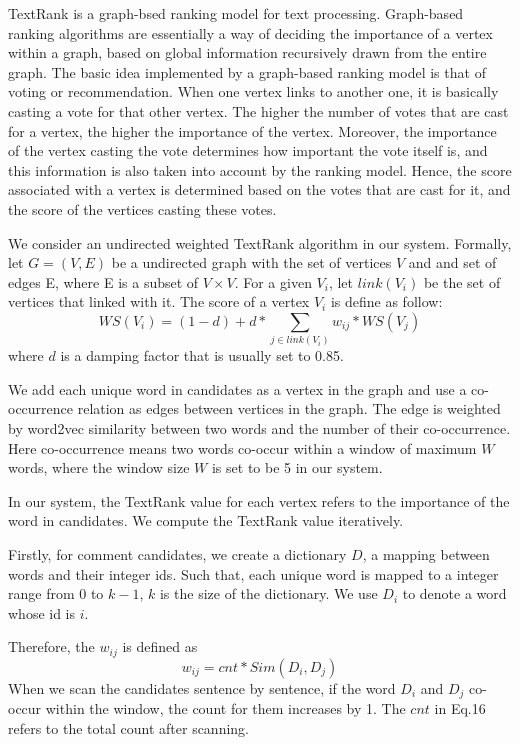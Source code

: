 \documentclass{sig-alternate}
\begin{document}
TextRank\cite{Mihalcea} is a graph-bsed ranking model for text processing. 
Graph-based ranking algorithms are essentially a
way of deciding the importance of a vertex within
a graph, based on global information recursively
drawn from the entire graph. The basic idea implemented
by a graph-based ranking model is that
of voting or recommendation. When one vertex
links to another one, it is basically casting a vote
for that other vertex. The higher the number of votes
that are cast for a vertex, the higher the importance
of the vertex. Moreover, the importance of the vertex
casting the vote determines how important the vote
itself is, and this information is also taken into account
by the ranking model. Hence, the score associated
with a vertex is determined based on the votes
that are cast for it, and the score of the vertices casting
these votes.

We consider an undirected weighted TextRank algorithm in our system. 
Formally, let $G = (V, E)$ be a undirected graph with the set of vertices $V$ and 
and set of edges E, where E is a subset of $V \times V$. For a given $V_i$, let 
$link(V_i)$ be the set of vertices that linked with it. The score of a vertex 
$V_i$ is define as follow:
\begin{equation}
  WS(V_i) = (1 - d) + d * \sum_{j \in link(V_i)}{w_{ij} * WS(V_j)}
\end{equation}
where $d$ is a damping factor\cite {Brin} that is usually set to 0.85.

We add each unique word in candidates as a vertex in the graph and use a 
co-occurrence relation as edges between vertices in the graph. The edge is 
weighted by word2vec similarity between two words and the number of their 
co-occurrence. Here co-occurrence means two words co-occur within a window of 
maximum $W$ words, where the window size $W$ is set to be 5 in our system.

In our system, the TextRank value for each vertex refers to the importance of 
the word in candidates. We compute the TextRank value iteratively.

Firstly, for comment candidates, we create a dictionary $D$, a mapping between words 
and their integer ids. Such that, each unique word is mapped to a integer range 
from $0$ to $k-1$, $k$ is the size of the dictionary. We use $D_i$ to denote a 
word whose id is $i$.

Therefore, the $w_{ij}$ is defined as
\begin{equation}
  w_{ij} = cnt * Sim(D_i, D_j)
\end{equation}
When we scan the candidates sentence by sentence, if the word $D_i$ and $D_j$ 
co-occur within the window, the count for them increases by 1. The $cnt$ in Eq.16
refers to the total count after scanning.
\end{document}
